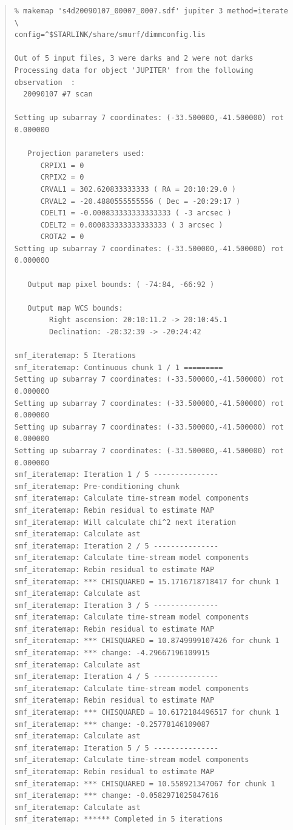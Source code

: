 \documentclass[twoside,11pt]{article}
\newenvironment{myquote}{\begin{quote}\begin{small}}{\end{small}\end{quote}}
\renewcommand{\_}{\texttt{\symbol{95}}}
\begin{document}
\begin{myquote}
\begin{verbatim}
% makemap 's4d20090107_00007_000?.sdf' jupiter 3 method=iterate \
config=^$STARLINK/share/smurf/dimmconfig.lis

Out of 5 input files, 3 were darks and 2 were not darks
Processing data for object 'JUPITER' from the following observation  :
  20090107 #7 scan

Setting up subarray 7 coordinates: (-33.500000,-41.500000) rot 0.000000

   Projection parameters used:
      CRPIX1 = 0
      CRPIX2 = 0
      CRVAL1 = 302.620833333333 ( RA = 20:10:29.0 )
      CRVAL2 = -20.4880555555556 ( Dec = -20:29:17 )
      CDELT1 = -0.000833333333333333 ( -3 arcsec )
      CDELT2 = 0.000833333333333333 ( 3 arcsec )
      CROTA2 = 0
Setting up subarray 7 coordinates: (-33.500000,-41.500000) rot 0.000000

   Output map pixel bounds: ( -74:84, -66:92 )

   Output map WCS bounds:
        Right ascension: 20:10:11.2 -> 20:10:45.1
        Declination: -20:32:39 -> -20:24:42

smf_iteratemap: 5 Iterations
smf_iteratemap: Continuous chunk 1 / 1 =========
Setting up subarray 7 coordinates: (-33.500000,-41.500000) rot 0.000000
Setting up subarray 7 coordinates: (-33.500000,-41.500000) rot 0.000000
Setting up subarray 7 coordinates: (-33.500000,-41.500000) rot 0.000000
Setting up subarray 7 coordinates: (-33.500000,-41.500000) rot 0.000000
smf_iteratemap: Iteration 1 / 5 ---------------
smf_iteratemap: Pre-conditioning chunk
smf_iteratemap: Calculate time-stream model components
smf_iteratemap: Rebin residual to estimate MAP
smf_iteratemap: Will calculate chi^2 next iteration
smf_iteratemap: Calculate ast
smf_iteratemap: Iteration 2 / 5 ---------------
smf_iteratemap: Calculate time-stream model components
smf_iteratemap: Rebin residual to estimate MAP
smf_iteratemap: *** CHISQUARED = 15.1716718718417 for chunk 1
smf_iteratemap: Calculate ast
smf_iteratemap: Iteration 3 / 5 ---------------
smf_iteratemap: Calculate time-stream model components
smf_iteratemap: Rebin residual to estimate MAP
smf_iteratemap: *** CHISQUARED = 10.8749999107426 for chunk 1
smf_iteratemap: *** change: -4.29667196109915
smf_iteratemap: Calculate ast
smf_iteratemap: Iteration 4 / 5 ---------------
smf_iteratemap: Calculate time-stream model components
smf_iteratemap: Rebin residual to estimate MAP
smf_iteratemap: *** CHISQUARED = 10.6172184496517 for chunk 1
smf_iteratemap: *** change: -0.25778146109087
smf_iteratemap: Calculate ast
smf_iteratemap: Iteration 5 / 5 ---------------
smf_iteratemap: Calculate time-stream model components
smf_iteratemap: Rebin residual to estimate MAP
smf_iteratemap: *** CHISQUARED = 10.558921347067 for chunk 1
smf_iteratemap: *** change: -0.0582971025847616
smf_iteratemap: Calculate ast
smf_iteratemap: ****** Completed in 5 iterations
\end{verbatim}
\end{myquote}
\end{document}

